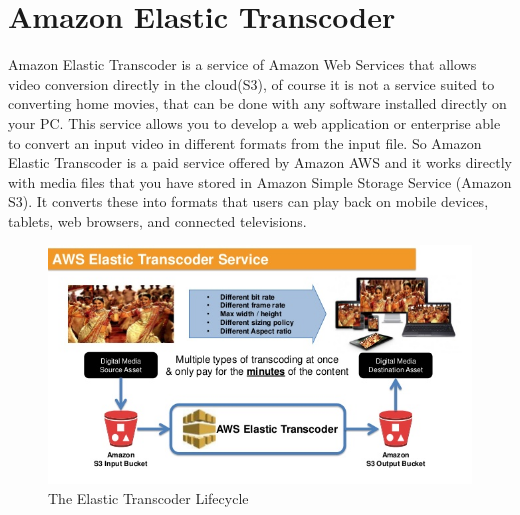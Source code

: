 \section{Amazon Elastic Transcoder}
\label{sec:Amazon Elastic Transcoder}

Amazon Elastic Transcoder is a service of Amazon Web Services that allows video conversion directly in the cloud(S3), of course it is not a service suited to converting home movies, that can be done with any software installed directly on your PC. 
This service allows you to develop a web application or enterprise able to convert an input video in different formats from the input file.
So Amazon Elastic Transcoder is a paid service offered by Amazon AWS and it works directly with media files that you have stored in Amazon Simple Storage Service (Amazon S3). It converts these into formats that users can play back on mobile devices, tablets, web browsers, and connected televisions.

\begin{figure}[htb] %
 \centering
 \includegraphics[width=1.0\linewidth]{images/chapter2/aws_transcoder.jpg}\hfill
 \caption[The Elastic Transcoder Lifecycle]{The Elastic Transcoder Lifecycle}
 \label{fig:fourV}
\end{figure}


